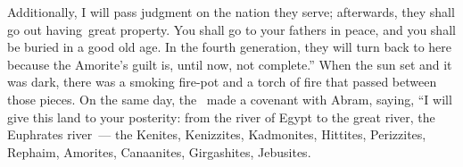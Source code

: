 \begin{inparaenum}
   Additionally, I will pass judgment on the nation they serve; afterwards, they shall go out having\understood\ great property.%
   You shall go to your fathers in peace, and you shall be buried in a good old age.%
   In the fourth generation, they will turn back to here because the Amorite's guilt is, until now, not complete.''%
   When the sun set and it was dark, there was a smoking fire-pot and a torch of fire that passed between those pieces.%
   On the same day, the \lord\ made a covenant with Abram, saying, ``I will give this land to your posterity: from the river of Egypt to the great river, the Euphrates river~---%
   the Kenites, Kenizzites, Kadmonites,%
   Hittites, Perizzites, Rephaim,%
   Amorites, Canaanites, Girgashites, Jebusites.%
\end{inparaenum}
